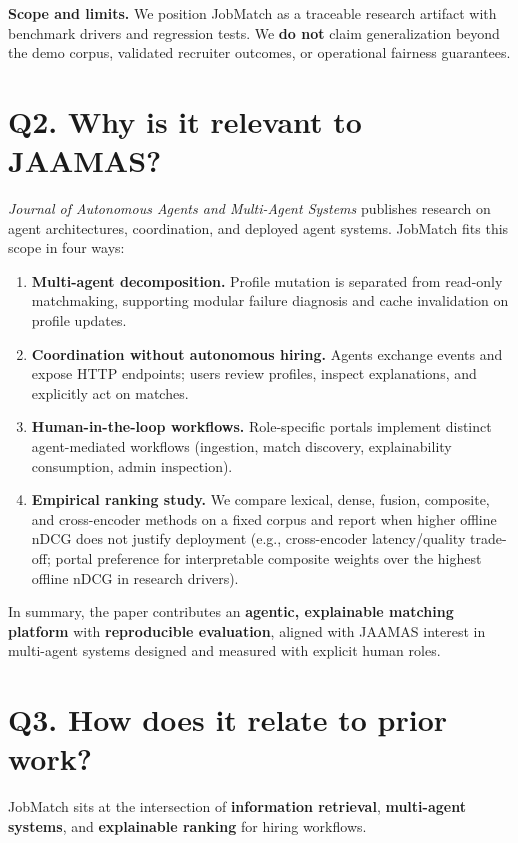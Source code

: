 \documentclass[11pt,a4paper]{article}
\begin{document}
\noindent\textbf{Scope and limits.} We position JobMatch as a traceable research artifact with benchmark drivers and regression tests. We \textbf{do not} claim generalization beyond the demo corpus, validated recruiter outcomes, or operational fairness guarantees.

\section*{Q2. Why is it relevant to JAAMAS?}

\textit{Journal of Autonomous Agents and Multi-Agent Systems} publishes research on agent architectures, coordination, and deployed agent systems. JobMatch fits this scope in four ways:

\begin{enumerate}[noitemsep]
  \item \textbf{Multi-agent decomposition.} Profile mutation is separated from read-only matchmaking, supporting modular failure diagnosis and cache invalidation on profile updates.
  \item \textbf{Coordination without autonomous hiring.} Agents exchange events and expose HTTP endpoints; users review profiles, inspect explanations, and explicitly act on matches.
  \item \textbf{Human-in-the-loop workflows.} Role-specific portals implement distinct agent-mediated workflows (ingestion, match discovery, explainability consumption, admin inspection).
  \item \textbf{Empirical ranking study.} We compare lexical, dense, fusion, composite, and cross-encoder methods on a fixed corpus and report when higher offline nDCG does not justify deployment (e.g., cross-encoder latency/quality trade-off; portal preference for interpretable composite weights over the highest offline nDCG in research drivers).
\end{enumerate}

In summary, the paper contributes an \textbf{agentic, explainable matching platform} with \textbf{reproducible evaluation}, aligned with JAAMAS interest in multi-agent systems designed and measured with explicit human roles.

\section*{Q3. How does it relate to prior work?}

JobMatch sits at the intersection of \textbf{information retrieval}, \textbf{multi-agent systems}, and \textbf{explainable ranking} for hiring workflows.
\end{document}
